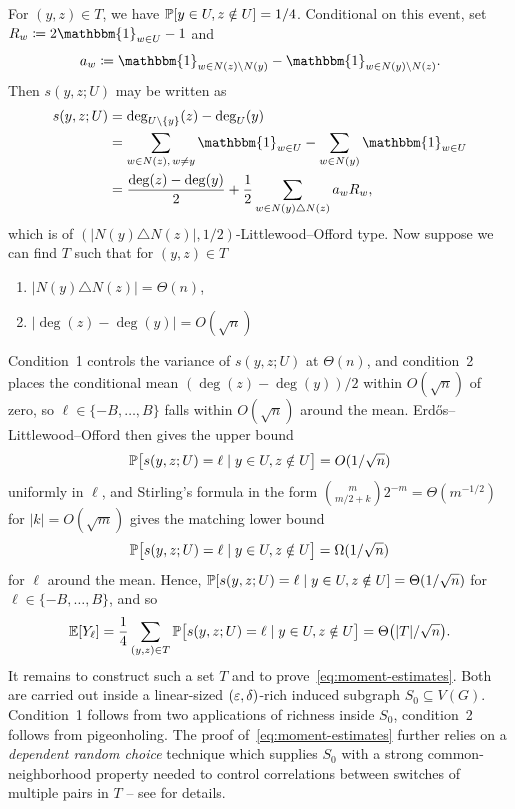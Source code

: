 For $(y, z) \in T$, we have $\mathbb{P}[y \in U, z \notin U] = 1/4$. Conditional on this event, set $R_w \coloneqq 2\mathbbm{1}_{w \in U} - 1$ and 
\[
  a_w \coloneqq \mathbbm{1}_{w \in N(z) \setminus N(y)} - \mathbbm{1}_{w \in N(y) \setminus N(z)}.
\]
Then $s(y, z; U)$ may be written as
\begin{align*}
  s(y, z; U)
  &= \deg_{U \setminus \{y\}}(z) - \deg_{U}(y) \\
  &= \sum_{w \in N(z),\, w \neq y} \mathbbm{1}_{w \in U} - \sum_{w \in N(y)} \mathbbm{1}_{w \in U} \\
  &= \frac{\deg(z) - \deg(y)}{2} + \frac{1}{2}\sum_{w \in N(y) \triangle N(z)} a_w R_w,
\end{align*}
which is of $(|N(y) \triangle N(z)|, 1/2)$-Littlewood--Offord type. Now suppose we can find $T$ such that for $(y, z) \in T$
\begin{enumerate}
  \item $|N(y) \triangle N(z)| = \Theta(n)$,
  \item $|\deg(z) - \deg(y)| = O(\sqrt{n})$
\end{enumerate}
Condition~1 controls the variance of $s(y, z; U)$ at $\Theta(n)$, and condition~2 places the conditional mean $(\deg(z) - \deg(y))/2$ within $O(\sqrt n)$ of zero, so $\ell \in \{-B, \ldots, B\}$ falls within $O(\sqrt n)$ around the mean. Erd\H{o}s--Littlewood--Offord then gives the upper bound
\[
  \mathbb{P}\bigl[s(y, z; U) = \ell \mid y \in U, z \notin U\bigr] = O(1/\sqrt n)
\]
uniformly in $\ell$, and Stirling's formula in the form $\binom{m}{m/2 + k} 2^{-m} = \Theta(m^{-1/2})$ for $|k| = O(\sqrt m)$ gives the matching lower bound 
\[
  \mathbb{P}\bigl[s(y, z; U) = \ell \mid y \in U, z \notin U\bigr] = \Omega(1/\sqrt n)
\]
for $\ell$ around the mean. Hence, $\mathbb{P}[s(y, z; U) = \ell \mid y \in U, z \notin U] = \Theta(1/\sqrt n)$ for $\ell \in \{-B, \ldots, B\}$, and so
\[
  \mathbb{E}[Y_\ell] = \frac{1}{4}\sum_{(y, z) \in T} \mathbb{P}\bigl[s(y, z; U) = \ell \mid y \in U, z \notin U\bigr] = \Theta\bigl(|T|/\sqrt n\bigr).
\]
It remains to construct such a set $T$ and to prove~\eqref{eq:moment-estimates}. Both are carried out inside a linear-sized $(\varepsilon, \delta)$-rich induced subgraph $S_0 \subseteq V(G)$. Condition~1 follows from two applications of richness inside $S_0$, condition~2 follows from pigeonholing. The proof of~\eqref{eq:moment-estimates} further relies on a \textit{dependent random choice} technique which supplies $S_0$ with a strong common-neighborhood property needed to control correlations between switches of multiple pairs in $T$ -- see \cite[Lemmas~13.1, 13.3, 13.4]{Kwan_2023} for details.